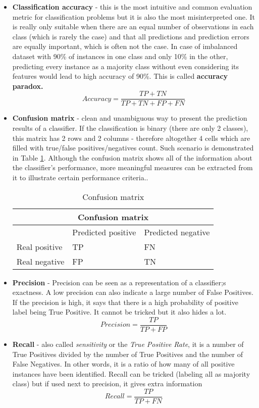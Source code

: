 \begin{itemize}
\item \textbf{Classification accuracy} - this is the most intuitive and common evaluation metric for classification problems but it is also the most misinterpreted one. It is really only suitable when there are an equal number of observations in each class (which is rarely the case) and that all predictions and prediction errors are equally important, which is often not the case. In case of imbalanced dataset with 90\% of instances in one class and only 10\% in the other, predicting every instance as a majority class without even considering its features would lead to high accuracy of 90\%. This is called \textbf{accuracy paradox.}
\[ Accuracy = \frac{TP + TN}{TP + TN + FP + FN}\]
\item \textbf{Confusion matrix} - clean and unambiguous way to present the prediction results of a classifier. If the classification is binary (there are only 2 classes), this matrix has 2 rows and 2 columns - therefore altogether 4 cells which are filled with true/false positives/negatives count. Such scenario is demonstrated in Table \ref{table:Confusion_matrix_general}. Although the confusion matrix shows all of the information about the classifier's performance, more meaningful measures can be extracted from it to illustrate certain performance criteria.\cite{bradley1997use}. 
\begin{table}[H]
{
\centering
\begin{tabular}{ |p{4cm}|p{4cm}|p{4cm}|  }
 \hline
 \multicolumn{3}{|c|}{Confusion matrix} \\
 \hline
  & Predicted positive & Predicted negative\\
 \hline
 Real positive   & TP    &FN\\ \hline
 Real negative &   FP  & TN\\ \hline
\end{tabular}
}
\caption{Confusion matrix}
\label{table:Confusion_matrix_general}
\end{table}

\item \textbf{Precision} - Precision can be seen as a representation of a classifier;s exactness. A low precision can also indicate a large number of False Positives. If the precision is high, it says that there is a high probability of positive label being True Positive. It cannot be tricked but it also hides a lot.
\[ Precision = \frac{TP}{TP + FP}\]
\item \textbf{Recall} - also called \textit{sensitivity} or the \textit{True Positive Rate}, it is a number of True Positives divided by the number of True Positives and the number of False Negatives. In other words, it is a ratio of how many of all positive instances have been identified. Recall can be tricked (labeling all as majority class) but if used next to precision, it gives extra information
\[ Recall = \frac{TP}{TP + FN}\]
\end{itemize}

